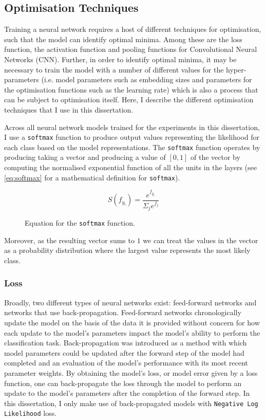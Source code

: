 \subsection{Optimisation Techniques}

Training a neural network requires a host of different techniques for optimisation, such that the model can identify optimal minima. Among these are the loss function, the activation function and pooling functions for Convolutional Neural Networks (CNN). Further, in order to identify optimal minima, it may be necessary to train the model with a number of different values for the hyper-parameters (i.e. model parameters such as embedding sizes and parameters for the optimisation functions such as the learning rate) which is also a process that can be subject to optimisation itself. Here, I describe the different optimisation techniques that I use in this dissertation. 

Across all neural network models trained for the experiments in this dissertation, I use a \texttt{softmax} function to produce output values representing the likelihood for each class based on the model representations. The \texttt{softmax} function operates by producing taking a vector and producing a value of $[0,1]$ of the vector by computing the normalised exponential function of all the units in the layers (see \cref{eq:softmax} for a mathematical definition for \texttt{softmax}).

\begin{figure}[h]
  \begin{equation}\label{eq:softmax}
    S(f_{y_i}) = \dfrac{e^{f_{y_{i}}}}{\Sigma_j e^{f_j}}
  \end{equation}
  \caption{Equation for the \texttt{softmax} function.}
\end{figure}

Moreover, as the resulting vector sums to $1$ we can treat the values in the vector as a probability distribution where the largest value represents the most likely class.

\subsubsection{Loss}

Broadly, two different types of neural networks exist: feed-forward networks and networks that use back-propagation. Feed-forward networks chronologically update the model on the basis of the data it is provided without concern for how each update to the model's parameters impact the model's ability to perform the classification task. 
Back-propagation \citep{Backprop paper} was introduced as a method with which model parameters could be updated after the forward step of the model had completed and an evaluation of the model's performance with its most recent parameter weights.
By obtaining the model's loss, or model error given by a loss function, one can back-propagate the loss through the model to perform an update to the model's parameters after the completion of the forward step.
In this dissertation, I only make use of back-propagated models with \texttt{Negative Log Likelihood} loss.

